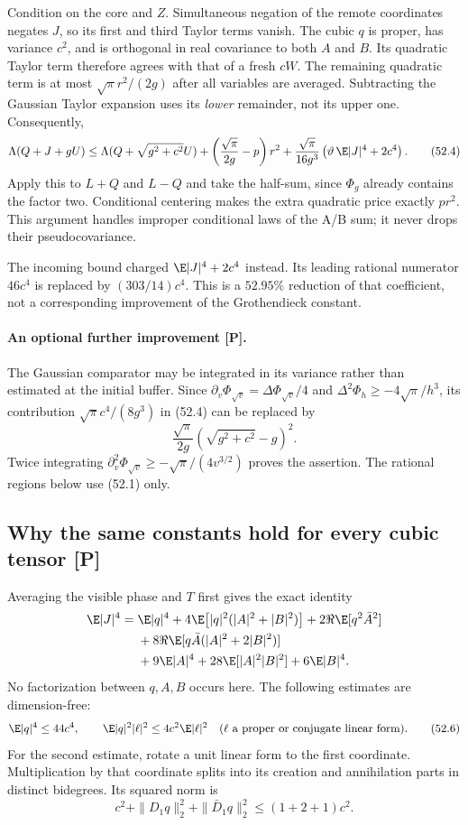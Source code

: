 Condition on the core and \(Z\). Simultaneous negation of the remote
coordinates negates \(J\), so its first and third Taylor terms vanish.
The cubic \(q\) is proper, has variance \(c^2\), and is orthogonal
in real covariance to both \(A\) and \(B\). Its quadratic Taylor term
therefore agrees with that of a fresh \(cW\).
The remaining quadratic term is at most
\(\sqrt\pi r^2/(2g)\) after all variables are averaged.
Subtracting the Gaussian Taylor expansion uses its \emph{lower}
remainder, not its upper one. Consequently,
\[
 \Lambda(Q+J+gU)\le
 \Lambda(Q+\sqrt{g^2+c^2}U)
 +\left(\frac{\sqrt\pi}{2g}-p\right)r^2+
 \frac{\sqrt\pi}{16g^3}
       \left(\vartheta\,\E|J|^4+2c^4\right).
 \tag{52.4}
\]
Apply this to \(L+Q\) and \(L-Q\) and take the half-sum, since
\(\Phi_g\) already contains the factor two.
Conditional centering makes the extra quadratic price exactly \(pr^2\).
This argument handles improper conditional laws of the A/B sum;
it never drops their pseudocovariance.

The incoming bound charged \(\E|J|^4+2c^4\) instead.
Its leading rational numerator \(46c^4\) is replaced by
\((303/14)c^4\). This is a \(52.95\%\) reduction of that coefficient,
not a corresponding improvement of the Grothendieck constant.

\paragraph{An optional further improvement [P].}
The Gaussian comparator may be integrated in its variance rather than
estimated at the initial buffer. Since
\(\partial_v\Phi_{\sqrt v}=\Delta\Phi_{\sqrt v}/4\) and
\(\Delta^2\Phi_h\ge-4\sqrt\pi/h^3\), its contribution
\(\sqrt\pi c^4/(8g^3)\) in (52.4) can be replaced by
\[
 \frac{\sqrt\pi}{2g}
       \left(\sqrt{g^2+c^2}-g\right)^2.
 \tag{52.5}
\]
Twice integrating
\(\partial_v^2\Phi_{\sqrt v}\ge-\sqrt\pi/(4v^{3/2})\)
proves the assertion. The rational regions below use (52.1) only.

\subsection{Why the same constants hold for every cubic tensor [P]}
Averaging the visible phase and \(T\) first gives the exact identity
\begin{align*}
\E|J|^4={}&\E|q|^4+
4\E\bigl[|q|^2(|A|^2+|B|^2)\bigr]
+2\Re\E[q^2\bar A^2]\\
&+8\Re\E[q\bar A(|A|^2+2|B|^2)]\\
&+9\E|A|^4+28\E[|A|^2|B|^2]+6\E|B|^4.
\end{align*}
No factorization between \(q,A,B\) occurs here.
The following estimates are dimension-free:
\[
 \E|q|^4\le44c^4,\qquad
 \E|q|^2|\ell|^2\le4c^2\E|\ell|^2
 \quad(\ell\text{ a proper or conjugate linear form}).
 \tag{52.6}
\]
For the second estimate, rotate a unit linear form to the first
coordinate. Multiplication by that coordinate splits into its
creation and annihilation parts in distinct bidegrees.
Its squared norm is
\[
 c^2+\|D_1q\|_2^2+\|\bar D_1q\|_2^2\le(1+2+1)c^2.
\]

